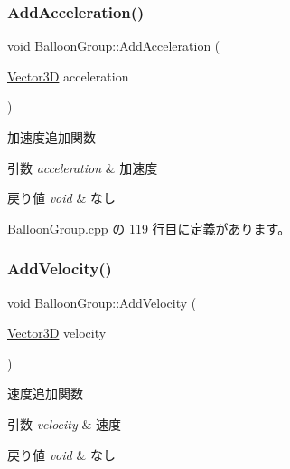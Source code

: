 \subsubsection{\texorpdfstring{Add\+Acceleration()}{AddAcceleration()}}
{\footnotesize\ttfamily void Balloon\+Group\+::\+Add\+Acceleration (\begin{DoxyParamCaption}\item[{\mbox{\hyperlink{class_vector3_d}{Vector3D}}}]{acceleration }\end{DoxyParamCaption})}



加速度追加関数 


\begin{DoxyParams}{引数}
{\em acceleration} & 加速度 \\
\hline
\end{DoxyParams}

\begin{DoxyRetVals}{戻り値}
{\em void} & なし \\
\hline
\end{DoxyRetVals}


 Balloon\+Group.\+cpp の 119 行目に定義があります。

\mbox{\label{class_balloon_group_addb01a96ff7f31b693d8f39757840234}} 
\subsubsection{\texorpdfstring{Add\+Velocity()}{AddVelocity()}}
{\footnotesize\ttfamily void Balloon\+Group\+::\+Add\+Velocity (\begin{DoxyParamCaption}\item[{\mbox{\hyperlink{class_vector3_d}{Vector3D}}}]{velocity }\end{DoxyParamCaption})}



速度追加関数 


\begin{DoxyParams}{引数}
{\em velocity} & 速度 \\
\hline
\end{DoxyParams}

\begin{DoxyRetVals}{戻り値}
{\em void} & なし \\
\hline
\end{DoxyRetVals}


